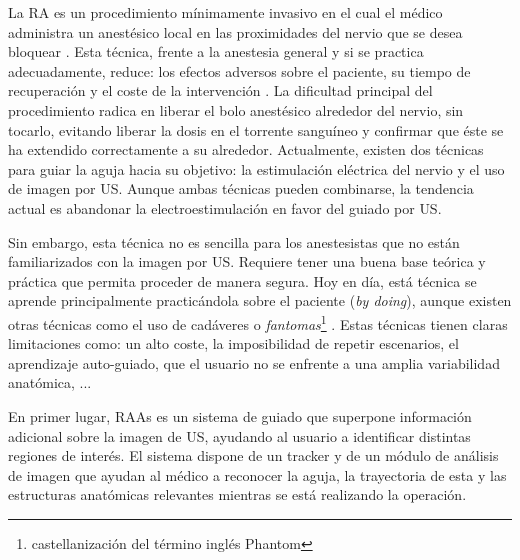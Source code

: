 La \ac{RA} es un procedimiento mínimamente invasivo en el cual el médico administra un anestésico local en las proximidades del nervio que se desea bloquear \cite{CVraisra}. Esta técnica, frente a la anestesia general y si se practica adecuadamente, reduce: los efectos adversos sobre el paciente, su tiempo de recuperación y el coste de la intervención \cite{PMID:26695878}. La dificultad principal del procedimiento radica en liberar el bolo anestésico alrededor del nervio, sin tocarlo, evitando liberar la dosis en el torrente sanguíneo y confirmar que éste se ha extendido correctamente a su alrededor. Actualmente, existen dos técnicas para guiar la aguja hacia su objetivo: la estimulación eléctrica del nervio y el uso de imagen por \ac{US}. Aunque ambas técnicas pueden combinarse, la tendencia actual es abandonar la electroestimulación en favor del guiado por \ac{US}.

Sin embargo, esta técnica no es sencilla para los anestesistas que no están familiarizados con la imagen por \ac{US}. Requiere tener una buena base teórica y práctica que permita proceder de manera segura. Hoy en día, está técnica se aprende principalmente practicándola sobre el paciente (\emph{by doing}), aunque existen otras técnicas como el uso de cadáveres \cite{Tsui2007} o \emph{fantomas}\footnote{castellanización del término inglés Phantom} \cite{phantomra}. Estas técnicas tienen claras limitaciones como: un alto coste, 
la imposibilidad de repetir escenarios, el aprendizaje auto-guiado, 
que el usuario no se enfrente a una amplia variabilidad anatómica, ...

En primer lugar, \ac{RAAs} es un sistema de guiado que superpone información adicional sobre la imagen de \ac{US}, ayudando al usuario a identificar distintas regiones de interés. El sistema dispone de un \ac{tracker} y de un módulo de análisis de imagen que ayudan al médico a reconocer la aguja, la trayectoria de esta y las estructuras anatómicas relevantes mientras se está realizando la operación. 


